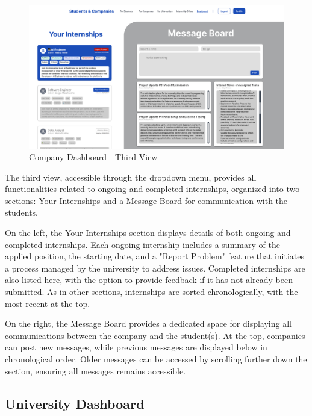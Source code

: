 \begin{figure} [H]
    \begin{center}
        \includegraphics[width=0.9\linewidth]{LaTeXCode/images/UI/Company Dashboard - Third View.png}
        \caption{Company Dashboard - Third View}
        \label{fig: dashboard_company_third}
    \end{center}
\end{figure}

The third view, accessible through the dropdown menu, provides all functionalities related to ongoing and completed internships, organized into two sections: Your Internships and a Message Board for communication with the students.

On the left, the Your Internships section displays details of both ongoing and completed internships. Each ongoing internship includes a summary of the applied position, the starting date, and a "Report Problem" feature that initiates a process managed by the university to address issues. Completed internships are also listed here, with the option to provide feedback if it has not already been submitted. As in other sections, internships are sorted chronologically, with the most recent at the top.

On the right, the Message Board provides a dedicated space for displaying all communications between the company and the student(s). At the top, companies can post new messages, while previous messages are displayed below in chronological order. Older messages can be accessed by scrolling further down the section, ensuring all messages remains accessible.

\subsection{University Dashboard}
\label{subsec: university_dashboard}

